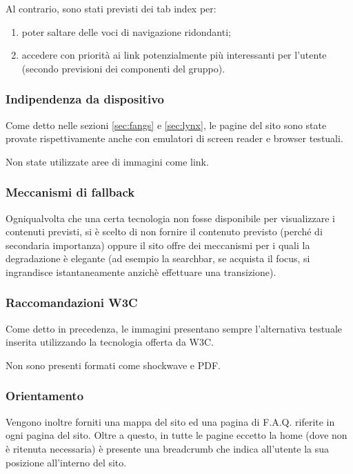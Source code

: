 Al contrario, sono stati previsti dei tab index per:
\begin{enumerate}
\item poter saltare delle voci di navigazione ridondanti;
\item accedere con priorità ai link potenzialmente più interessanti per
l'utente (secondo previsioni dei componenti del gruppo).
\end{enumerate}

\subsubsection{Indipendenza da dispositivo}
Come detto nelle sezioni \ref{sec:fangs} e \ref{sec:lynx}, le pagine del sito
sono state provate rispettivamente anche con emulatori di screen reader e
browser testuali.

Non state utilizzate aree di immagini come link.

\subsubsection{Meccanismi di fallback}
Ogniqualvolta che una certa tecnologia non fosse disponibile per visualizzare i
contenuti previsti, si è scelto di non fornire il contenuto previsto (perché
di secondaria importanza) oppure il sito offre dei meccanismi per i quali la
degradazione è elegante (ad esempio la searchbar, se acquista il focus, si
ingrandisce istantaneamente anzichè effettuare una transizione).

\subsubsection{Raccomandazioni W3C}
Come detto in precedenza, le immagini presentano sempre l'alternativa testuale
inserita utilizzando la tecnologia offerta da W3C.

Non sono presenti formati come shockwave e PDF.

\subsubsection{Orientamento}
Vengono inoltre forniti una mappa del sito ed una pagina di F.A.Q. riferite in
ogni pagina del sito. Oltre a questo, in tutte le pagine eccetto la home (dove
non è ritenuta necessaria) è presente una breadcrumb che indica all'utente la
sua posizione all'interno del sito.

